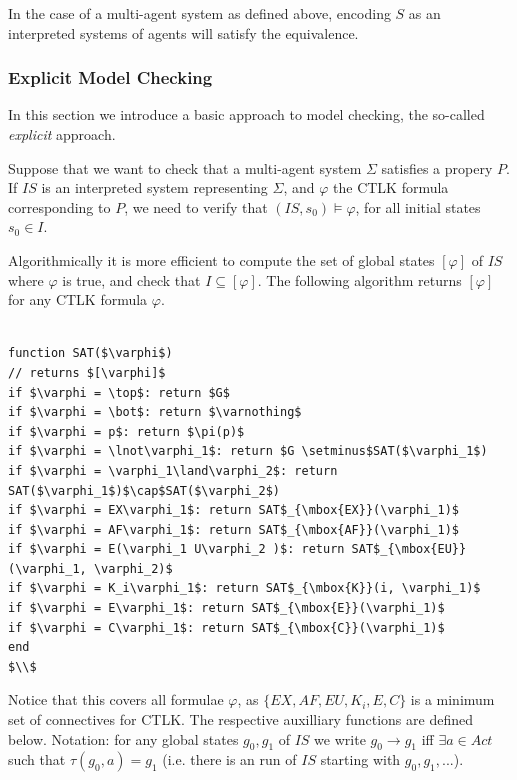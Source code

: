 \documentclass[12]{article}
\begin{document}
In the case of a multi-agent system as defined above, encoding $S$ as an interpreted systems of agents will satisfy the equivalence. 

\subsubsection{Explicit Model Checking}

\label{explicit}
In this section we introduce a basic approach to model checking, the so-called \textit{explicit} approach.

Suppose that we want to check that a multi-agent system $\Sigma$ satisfies a propery $P$. If $IS$ is an interpreted system representing $\Sigma$, and $\varphi$ the CTLK formula corresponding to $P$, we need to verify that $(IS, s_0) \models \varphi$, for all initial states $s_0 \in I$.

Algorithmically it is more efficient \cite{need ref} to compute the set of global states $[\varphi]$ of $IS$ where $\varphi$ is true, and check that $I \subseteq [\varphi]$. 
The following algorithm returns $[\varphi]$ for any CTLK formula $\varphi$.


\begin{lstlisting}[mathescape]

function SAT($\varphi$) 
// returns $[\varphi]$
if $\varphi = \top$: return $G$
if $\varphi = \bot$: return $\varnothing$
if $\varphi = p$: return $\pi(p)$ 
if $\varphi = \lnot\varphi_1$: return $G \setminus$SAT($\varphi_1$)
if $\varphi = \varphi_1\land\varphi_2$: return SAT($\varphi_1$)$\cap$SAT($\varphi_2$)
if $\varphi = EX\varphi_1$: return SAT$_{\mbox{EX}}(\varphi_1)$
if $\varphi = AF\varphi_1$: return SAT$_{\mbox{AF}}(\varphi_1)$
if $\varphi = E(\varphi_1 U\varphi_2 )$: return SAT$_{\mbox{EU}}(\varphi_1, \varphi_2)$
if $\varphi = K_i\varphi_1$: return SAT$_{\mbox{K}}(i, \varphi_1)$
if $\varphi = E\varphi_1$: return SAT$_{\mbox{E}}(\varphi_1)$
if $\varphi = C\varphi_1$: return SAT$_{\mbox{C}}(\varphi_1)$
end
$\\$
\end{lstlisting}

Notice that this covers all formulae $\varphi$, as $\{EX, AF, EU, K_i, E, C\}$ is a minimum set of connectives for CTLK. The respective auxilliary functions are defined below. Notation: for any global states $g_0, g_1$ of $IS$ we write $g_0 \rightarrow g_1$ iff $\exists a \in Act$ such that $\tau(g_0, a) = g_1$ (i.e. there is an run of $IS$ starting with $g_0, g_1, ...$).
\end{document}
